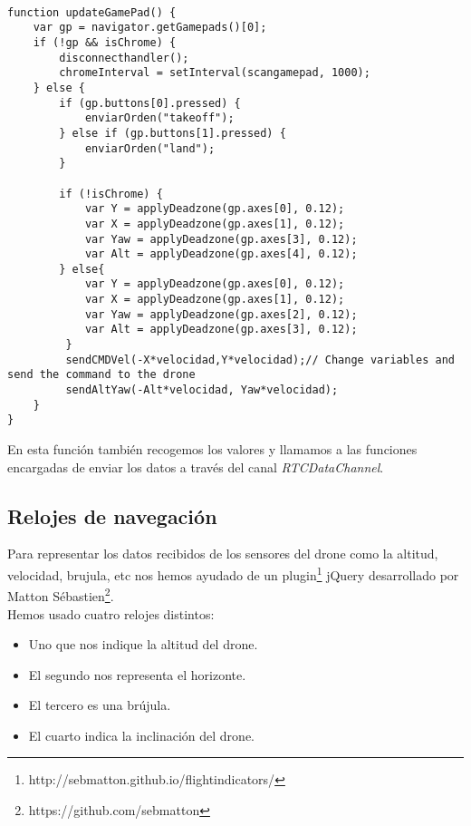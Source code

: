 \begin{lstlisting}[caption=Manajador de mando.]

function updateGamePad() {
    var gp = navigator.getGamepads()[0];
    if (!gp && isChrome) {
        disconnecthandler();
        chromeInterval = setInterval(scangamepad, 1000);        
    } else {
        if (gp.buttons[0].pressed) {
            enviarOrden("takeoff");
        } else if (gp.buttons[1].pressed) {
            enviarOrden("land");
        }
        
        if (!isChrome) {
            var Y = applyDeadzone(gp.axes[0], 0.12);
            var X = applyDeadzone(gp.axes[1], 0.12);
            var Yaw = applyDeadzone(gp.axes[3], 0.12);
            var Alt = applyDeadzone(gp.axes[4], 0.12);
        } else{
            var Y = applyDeadzone(gp.axes[0], 0.12);
            var X = applyDeadzone(gp.axes[1], 0.12);
            var Yaw = applyDeadzone(gp.axes[2], 0.12);
            var Alt = applyDeadzone(gp.axes[3], 0.12);
         }
         sendCMDVel(-X*velocidad,Y*velocidad);// Change variables and send the command to the drone
         sendAltYaw(-Alt*velocidad, Yaw*velocidad);
    }
}
\end{lstlisting}

En esta función también recogemos los valores y llamamos a las funciones encargadas de enviar los datos a través del canal \emph{RTCDataChannel}.\\


\subsection{Relojes de navegación}\label{subsec:relojesnavegacion}

Para representar los datos recibidos de los sensores del drone como la altitud, velocidad, brujula, etc nos hemos ayudado de un plugin\footnote{http://sebmatton.github.io/flightindicators/}\cite{jqueryflightindicator} jQuery desarrollado por Matton Sébastien\footnote{https://github.com/sebmatton}.\\

Hemos usado cuatro relojes distintos: 

\begin{itemize}
\item Uno que nos indique la altitud del drone.
\item El segundo nos representa el horizonte.
\item El tercero es una brújula.
\item El cuarto indica la inclinación del drone.
\end{itemize}


